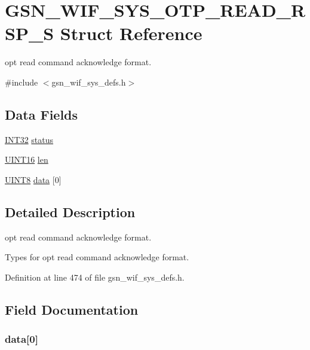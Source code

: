 \hypertarget{a00359}{
\section{GSN\_\-WIF\_\-SYS\_\-OTP\_\-READ\_\-RSP\_\-S Struct Reference}
\label{a00359}
}


opt read command acknowledge format.  




{\ttfamily \#include $<$gsn\_\-wif\_\-sys\_\-defs.h$>$}

\subsection*{Data Fields}
\begin{DoxyCompactItemize}
\item 
\hyperlink{a00660_ga63021d67d54286c2163bcdb43a6f2569}{INT32} \hyperlink{a00359_ace2e01f5af9f89f72123dd8a132b9551}{status}
\item 
\hyperlink{a00660_ga09f1a1fb2293e33483cc8d44aefb1eb1}{UINT16} \hyperlink{a00359_ab3bcead9c261261394a5d9b3bf8f95cb}{len}
\item 
\hyperlink{a00660_gab27e9918b538ce9d8ca692479b375b6a}{UINT8} \hyperlink{a00359_a29500e452cff835f2b70d1dff36f918a}{data} \mbox{[}0\mbox{]}
\end{DoxyCompactItemize}


\subsection{Detailed Description}
opt read command acknowledge format. 

Types for opt read command acknowledge format. 

Definition at line 474 of file gsn\_\-wif\_\-sys\_\-defs.h.



\subsection{Field Documentation}
\hypertarget{a00359_a29500e452cff835f2b70d1dff36f918a}{
\subsubsection[{data}]{ {\bf data}\mbox{[}0\mbox{]}}}
\label{a00359_a29500e452cff835f2b70d1dff36f918a}


